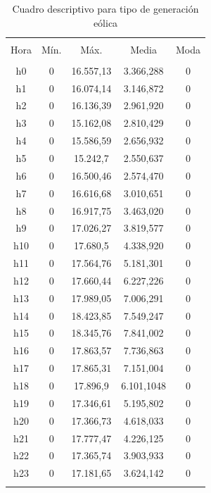 \documentclass[conference, 10pt]{IEEEtran}
\begin{document}
\begin{table}[!htbp] \centering 
  \caption{Cuadro descriptivo para tipo de generación eólica} 
  \begin{tabular}{@{\extracolsep{5pt}} ccccc} 
\\[-1.8ex]\hline 
\hline \\[-1.8ex] 
Hora & Mín. & Máx. & Media & Moda \\ 
\hline \\[-1.8ex] 
h0 & 0 & 16.557,13 & 3.366,288& 0 \\ 
h1 & 0 & 16.074,14 & 3.146,872& 0 \\ 
h2 & 0 & 16.136,39 & 2.961,920& 0 \\ 
h3 & 0 & 15.162,08 & 2.810,429& 0 \\ 
h4 & 0 & 15.586,59 & 2.656,932& 0 \\ 
h5 & 0 & 15.242,7 & 2.550,637& 0 \\ 
h6 & 0 & 16.500,46 & 2.574,470& 0 \\ 
h7 & 0 & 16.616,68 & 3.010,651& 0 \\ 
h8 & 0 & 16.917,75 & 3.463,020& 0 \\ 
h9 & 0 & 17.026,27 & 3.819,577& 0 \\ 
h10 & 0 & 17.680,5 & 4.338,920& 0 \\ 
h11 & 0 & 17.564,76 & 5.181,301& 0 \\ 
h12 & 0 & 17.660,44 & 6.227,226& 0 \\ 
h13 & 0 & 17.989,05 & 7.006,291& 0 \\ 
h14 & 0 & 18.423,85 & 7.549,247& 0 \\ 
h15 & 0 & 18.345,76 & 7.841,002& 0 \\ 
h16 & 0 & 17.863,57 & 7.736,863& 0 \\ 
h17 & 0 & 17.865,31 & 7.151,004& 0 \\ 
h18 & 0 & 17.896,9 & 6.101,1048& 0 \\ 
h19 & 0 & 17.346,61 & 5.195,802& 0 \\ 
h20 & 0 & 17.366,73 & 4.618,033& 0 \\ 
h21 & 0 & 17.777,47 & 4.226,125& 0 \\ 
h22 & 0 & 17.365,74 & 3.903,933& 0 \\ 
h23 & 0 & 17.181,65 & 3.624,142& 0 \\ 
\hline \\[-1.8ex] 
\end{tabular} 
\label{tab_19}
\end{table}
\end{document}
